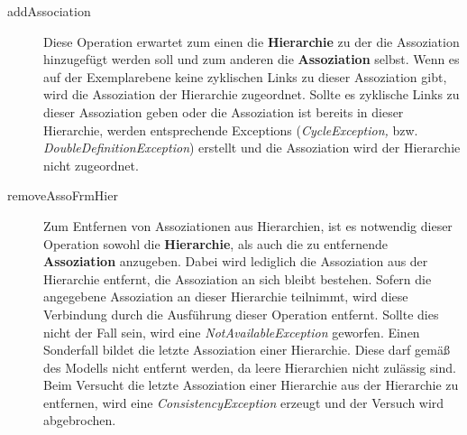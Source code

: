\begin{description}
\item[addAssociation] Diese Operation erwartet zum einen die \textbf{Hierarchie} zu der die Assoziation hinzugefügt werden soll und zum anderen die \textbf{Assoziation} selbst.
Wenn es auf der Exemplarebene keine zyklischen Links zu dieser Assoziation gibt, wird die Assoziation der Hierarchie zugeordnet. Sollte es zyklische Links
zu dieser Assoziation geben oder die Assoziation ist bereits in dieser Hierarchie, werden entsprechende Exceptions (\emph{CycleException,} bzw. \emph{DoubleDefinitionException}) 
erstellt und die Assoziation wird der Hierarchie nicht zugeordnet.
\item[removeAssoFrmHier] Zum Entfernen von Assoziationen aus Hierarchien, ist es notwendig dieser Operation sowohl die \textbf{Hierarchie}, als auch die zu entfernende 
\textbf{Assoziation} anzugeben. Dabei wird lediglich die Assoziation aus der Hierarchie entfernt, die Assoziation an sich bleibt bestehen. 
Sofern die angegebene Assoziation an dieser Hierarchie teilnimmt, wird diese Verbindung durch die Ausführung dieser Operation entfernt. 
Sollte dies nicht der Fall sein, wird eine \emph{NotAvailableException} geworfen. Einen Sonderfall bildet die letzte Assoziation einer
Hierarchie. Diese darf gemäß des Modells nicht entfernt werden, da leere Hierarchien nicht zulässig sind. Beim Versucht die letzte
Assoziation einer Hierarchie aus der Hierarchie zu entfernen, wird eine \emph{ConsistencyException} erzeugt und der Versuch wird abgebrochen. 
\end{description}